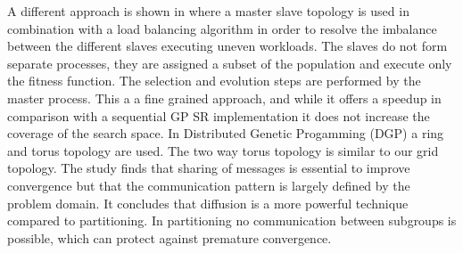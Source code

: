 A different approach is shown in \citep{DFGPSR} where a master slave topology is used in combination with a load balancing algorithm in order to resolve the imbalance between the different slaves executing uneven workloads. The slaves do not form separate processes, they are assigned a subset of the population and execute only the fitness function. The selection and evolution steps are performed by the master process. This a a fine grained approach, and while it offers a speedup in comparison with a sequential GP SR implementation it does not increase the coverage of the search space. 
In Distributed Genetic Progamming (DGP) \cite{DGP} a ring and torus topology are used. The two way torus topology is similar to our grid topology. The study finds that sharing of messages is essential to improve convergence but that the communication pattern is largely defined by the problem domain. It concludes that diffusion is a more powerful technique compared to partitioning. In partitioning no communication between subgroups is possible, which can protect against premature convergence.
